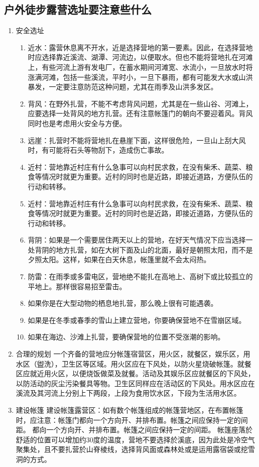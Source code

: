 \documentclass[UTF8]{ctexbook}
\begin{document}
\subsection{户外徒步露营选址要注意些什么}
\begin{enumerate}
    \item 安全选址
    \begin{enumerate}
        \item 近水：露营休息离不开水，近是选择营地的第一要素。因此，在选择营地时应选择靠近溪流、湖潭、河流边，以便取水。但也不能将营地扎在河滩上，有些河流上游有发电厂，在蓄水期间河滩宽、水流小，一旦放水时将涨满河滩，包括一些溪流，平时小，一旦下暴雨，都有可能发大水或山洪暴发，一定要注意防范这种问题，尤其在雨季及山洪多发区。
        \item 背风：在野外扎营，不能不考虑背风问题，尤其是在一些山谷、河滩上，应要选择一处背风的地方扎营。还有注意帐篷门的朝向不要迎着风。背风同时也是考虑用火安全与方便。
        \item 远崖：扎营时不能将营地扎在悬崖下面，这样很危险，一旦山上刮大风时，有可能将石头等物刮下，造成伤亡事故。
        \item 近村：营地靠近村庄有什么急事可以向村民求救，在没有柴禾、蔬菜、粮食等情况时就更为重要。近村的同时也是近路，即接近道路，方便队伍的行动和转移。
        \item 近村：营地靠近村庄有什么急事可以向村民求救，在没有柴禾、蔬菜、粮食等情况时就更为重要。近村的同时也是近路，即接近道路，方便队伍的行动和转移。
        \item 背阴：如果是一个需要居住两天以上的营地，在好天气情况下应当选择一处背阴的地方扎营，如在大树下面及山的北面，最好是朝照太阳，而不是夕照太阳。这样，如果在白天休息，帐篷里就不会太闷热。
        \item 防雷：在雨季或多雷电区，营地绝不能扎在高地上、高树下或比较孤立的平地上。那样很容易招至雷击。
        \item 如果你是在大型动物的栖息地扎营，那么晚上很有可能遇袭。
        \item 如果是在冬季或春季的雪山上建立营地，你要确保营地不在雪崩区域。
        \item 如果在海边、沙滩上扎营，要确保营地的位置不受涨潮的影响。
    \end{enumerate}
    \item 合理的规划
    一个齐备的营地应分帐篷宿营区，用火区，就餐区，娱乐区，用水区（盥洗），卫生区等区域。用火区应在下风处，以防火星烧破帐篷。就餐区应就近用火区，以便烧饭做菜及就餐。活动及其娱乐区应就餐区的下风处，以防活动的灰尘污染餐具等物。卫生区同样应在活动区的下风处。用水区应在溪流及其河流上分别上下两段，上段为食用饮水区，下段为生活用水区。
    \item 建设帐篷
    建设帐篷露营区：如有数个帐篷组成的帐篷营地区，在布置帐篷时，应注意：帐篷门都向一个方向开、并排布置。帐篷之间应保持一定的间距。 都向一个方向开、并排布置。帐篷之间应保持一定的间距。
帐篷座落於舒适的位置可以增加约30度的温度，营地不要选择於溪底，因为此处是冷空气聚集处，且不要扎营於山脊棱线，选择背风面或森林处或是运用露宿袋或挖雪洞的方式。
\end{enumerate}
\end{document}
